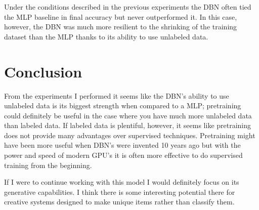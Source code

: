 \documentclass{article}
\begin{document}
	Under the conditions described in the previous experiments the DBN  often tied the MLP baseline in final accuracy but never outperformed it. In this case, however, the DBN was much more resilient to the shrinking of the training dataset than the MLP thanks to its ability to use unlabeled data.
	
	\section{Conclusion}
	From the experiments I performed it seems like the DBN's ability to use unlabeled data is its biggest strength when compared to a MLP;  pretraining could definitely be useful in the case where you have much more unlabeled data than labeled data. If labeled data is plentiful, however, it seems like pretraining does not provide many advantages over supervised techniques. Pretraining might have been more useful when DBN's were invented 10 years ago but with the power and speed of modern GPU's it is often more effective to do supervised training from the beginning.
	
	If I were to continue working with this model I would definitely focus on its generative capabilities. I think there is some interesting potential there for creative systems designed to make unique items rather than classify them.  	
	
\end{document}
